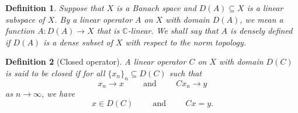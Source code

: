 \documentclass{article}
\newtheorem{definition}{Definition}
\begin{document}
\begin{definition}\label{def:ImportantDefinition}
Suppose that $X$ is a Banach space and $D(A)\subseteq X$ is a linear subspace of $X$. By a linear operator $A$ on $X$ with domain $D(A)$, we mean a function $A:D(A)\rightarrow X$ that is $\mathbb{C}$-linear. We shall say that $A$ is densely defined if $D(A)$ is a dense subset of $X$ with respect to the norm topology.
\end{definition}

\begin{definition}[Closed operator]\label{def:AnotherImportantDefinition}
A linear operator $C$ on $X$ with domain $D(C)$ is said to be closed if for all $\{x_n\}_n\subseteq D(C)$ such that
\begin{equation*}
x_n\rightarrow x\hspace{1cm}\mbox{and}\hspace{1cm}Cx_n\rightarrow y
\end{equation*}
as $n\rightarrow \infty$, we have 
\begin{equation*}
x\in D(C)\hspace{1cm}\mbox{and}\hspace{1cm}Cx=y.
\end{equation*}
\end{definition}
\end{document}
